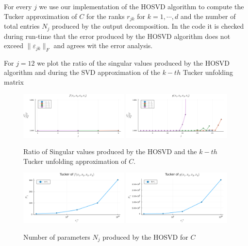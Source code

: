 \documentclass[a4paper]{article}
\newcommand{\eps}{\varepsilon}
\begin{document}
For every $j$ we use our implementation of the HOSVD algorithm to compute the
Tucker approximation of $C$ for the ranks $r_{jk}$ for $k = 1, \cdots ,d$ and
the number of total entries $N_j$ produced by the output decomposition. In
the code \cite{code} it is checked during run-time that the error produced by
the HOSVD algorithm does not exceed $\|\eps_{jk}\|_F$ and agrees wit the
error analysis.

For $j = 12$ we plot the ratio of the singular values produced by the HOSVD
algorithm and during the SVD approximation of the $k-th$ Tucker unfolding
matrix
\begin{figure}[H]
    \centering
    \includegraphics[width=0.49\textwidth]{./plots/hosvd-sigmaratio-a.png}
    \includegraphics[width=0.49\textwidth]{./plots/hosvd-sigmaratio-b.png}
    \caption{Ratio of Singular values produced by the HOSVD and the $k-th$
    Tucker unfolding approximation of $C$.}
\end{figure}

\begin{figure}[H]
    \centering
    \includegraphics[width=0.49\textwidth]{./plots/hosvd-Nj-a.png}
    \includegraphics[width=0.49\textwidth]{./plots/hosvd-Nj-b.png}
    \caption{Number of parameters $N_j$ produced by the HOSVD for $C$}
\end{figure}
\end{document}
